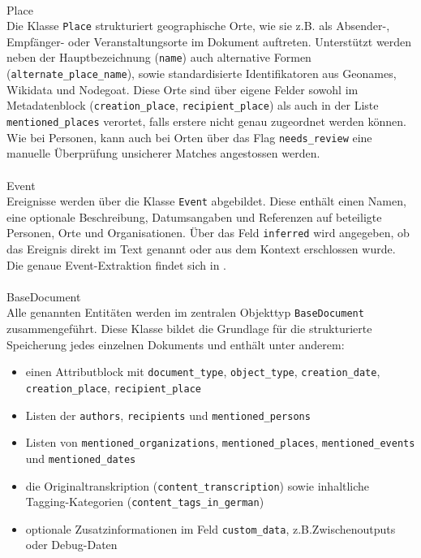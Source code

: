 \documentclass[12pt, a4paper, ngerman, bidi=default]{article}
\makeatletter
\newcommand{\code}[1]{\colorbox{VeryLightGray}{\texttt{#1}}} %
\let\oldparagraph\paragraph%
\renewcommand{\paragraph}{
    \@ifstar%
      \xxxParagraphStar%
      \xxxParagraphNoStar%
 }
\newcommand{\xxxParagraphStar}[1]{\oldparagraph*{#1}\mbox{}}
\newcommand{\xxxParagraphNoStar}[1]{\oldparagraph{#1}\mbox{}}
\makeatother
\begin{document}
\paragraph{Place}\\
Die Klasse \code{Place} strukturiert geographische Orte, wie sie z.B. als Absender-, Empfänger- oder 
Veranstaltungsorte im Dokument auftreten. Unterstützt werden neben der Hauptbezeichnung (\code{name}) 
auch alternative Formen (\code{alternate\_place\_name}), sowie standardisierte Identifikatoren aus Geonames, 
Wikidata und Nodegoat. Diese Orte sind über eigene Felder sowohl im Metadatenblock (\code{creation\_place}, 
\code{recipient\_place}) als auch in der Liste \code{mentioned\_places} verortet, falls erstere nicht genau zugeordnet werden können. 
Wie bei Personen, kann auch bei Orten 
über das Flag \code{needs\_review} eine manuelle Überprüfung unsicherer Matches angestossen werden.

\paragraph{Event}\\
Ereignisse werden über die Klasse \code{Event} abgebildet. Diese enthält einen Namen, eine optionale Beschreibung, 
Datumsangaben und Referenzen auf beteiligte Personen, Orte und Organisationen. Über das Feld \code{inferred} wird angegeben, 
ob das Ereignis direkt im Text genannt oder aus dem Kontext erschlossen wurde. Die genaue Event-Extraktion findet sich 
in .

\paragraph{BaseDocument}\\
Alle genannten Entitäten werden im zentralen Objekttyp \code{BaseDocument} zusammengeführt. Diese Klasse bildet 
die Grundlage für die strukturierte Speicherung jedes einzelnen Dokuments und enthält unter anderem:
\begin{itemize}
\item einen Attributblock mit \code{document\_type}, \code{object\_type}, \code{creation\_date}, \code{creation\_place}, \code{recipient\_place}
\item Listen der \code{authors}, \code{recipients} und \code{mentioned\_persons}
\item Listen von \code{mentioned\_organizations}, \code{mentioned\_places}, \code{mentioned\_events} und \code{mentioned\_dates}
\item die Originaltranskription (\code{content\_transcription}) sowie inhaltliche Tagging-Kategorien (\code{content\_tags\_in\_german})
\item optionale Zusatzinformationen im Feld \code{custom\_data}, z.B.Zwischenoutputs oder Debug-Daten
\end{itemize}
\end{document}
